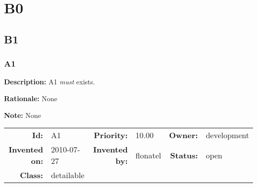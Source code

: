 \chapter{B0}
\section{B1}
\subsection{A1}\label{A1}
\textbf{Description:} A1 \textsl{must} exists.

\textbf{Rationale:} None

\textbf{Note:} None

\par
{\small \begin{center}\begin{tabular}{rlrlrl}
\textbf{Id:} & A1 & \textbf{Priority:} & 10.00 & \textbf{Owner:} & development \\ 
\textbf{Invented on:} & 2010-07-27 & \textbf{Invented by:} & flonatel & \textbf{Status:} & open \\ 
\textbf{Class:} & detailable & & & & \\ 
\end{tabular}\end{center} }